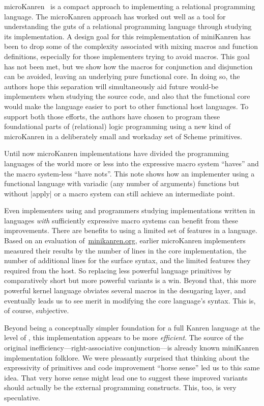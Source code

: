 \documentclass[sigplan,screen,draft,anonymous,review,natbib=false]{acmart}
\begin{document}
microKanren~\cite{hemann2013muKanren} is a compact approach to
implementing a relational programming language. The microKanren
approach has worked out well as a tool for understanding the guts of a
relational programming language through studying its implementation. A
design goal for this reimplementation of miniKanren has been to drop
some of the complexity associated with mixing macros and function
definitions, especially for those implementers trying to avoid macros.
This goal has not been met, but we show how the macros for conjunction
and disjunction can be avoided, leaving an underlying pure functional
core. In doing so, the authors hope this separation will
simultaneously aid future would-be implementers when studying the
source code, and also that the functional core would make the language
easier to port to other functional host languages. To support both
those efforts, the authors have chosen to program these foundational
parts of (relational) logic programming using a new kind of
microKanren in a deliberately small and workaday set of Scheme
primitives.

Until now microKanren implementations have divided the programming
languages of the world more or less into the expressive macro system
\enquote{haves} and the macro system-less \enquote{have nots}. This
note shows how an implementer using a functional language with
variadic (any number of arguments) functions but without
\rackinline|apply| or a macro system can still achieve an intermediate
point.

Even implementers using and programmers studying implementations
written in languages \emph{with} sufficiently expressive macro systems
can benefit from these improvements. There are benefits to using a
limited set of features in a language. Based on an evaluation
of~\href{minikanren.org}{minikanren.org}, earlier microKanren
implementers measured their results by the number of lines in the core
implementation, the number of additional lines for the surface syntax,
and the limited features they required from the host. So replacing
less powerful language primitives by comparatively short but more
powerful variants is a win. Beyond that, this more powerful kernel
language obviates several macros in the desugaring layer, and
eventually leads us to see merit in modifying the core language's
syntax. This is, of course, subjective.

Beyond being a conceptually simpler foundation for a full Kanren
language at the level of , this
implementation appears to be more \emph{efficient}. The source of the
original inefficiency---right-associative conjunction---is already
known miniKanren implementation folklore. We were pleasantly surprised
that thinking about the expressivity of primitives and code
improvement \enquote{horse sense} led us to this same idea. That very
horse sense might lead one to suggest these improved variants should
actually be the external programming constructs. This, too, is very
speculative.
\end{document}
